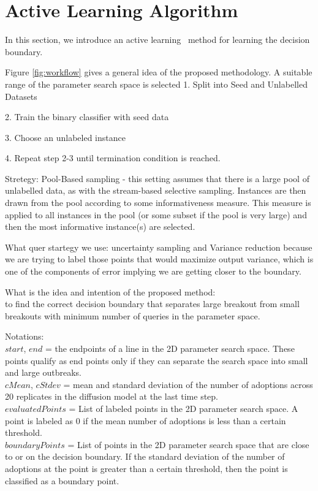 \section{Active Learning Algorithm}
In this section, we introduce an active learning~\cite{sung95active} method for learning the decision boundary. 

Figure \ref{fig:workflow} gives a general idea of the proposed methodology. A suitable range of the parameter search space is selected
1. Split into Seed and Unlabelled Datasets

2. Train the binary classifier with seed data

3. Choose an unlabeled instance

4. Repeat step 2-3 until termination condition is reached.



Stretegy:
Pool-Based sampling - this setting assumes that there is a large pool of unlabelled data, as with the stream-based selective sampling. Instances are then drawn from the pool according to some informativeness measure. This measure is applied to all instances in the pool (or some subset if the pool is very large) and then the most informative instance(s) are selected.

What quer startegy we use: uncertainty sampling and Variance reduction because we are trying to label those points that would maximize output variance, which is one of the components of error implying we are getting closer to the boundary.


What is the idea and intention of the proposed method: \\
to find the correct decision boundary that separates large breakout from small breakouts with minimum number of queries in the parameter space.



Notations:\\
$start$, $end$ = the endpoints of a line in the 2D parameter search space. These points qualify as end points only if they can separate the search space into small and large outbreaks. \\
\noindent
$cMean$, $cStdev$ = mean and standard deviation of the number of adoptions across 20 replicates in the diffusion model at the last time step.\\
\noindent
$evaluatedPoints$ = List of labeled points in the 2D parameter search space. A point is labeled as 0 if the mean number of adoptions is less than a certain threshold.\\
\noindent
$boundaryPoints$ = List of points in the 2D parameter search space that are close to or on the decision boundary. If the standard deviation of the number of adoptions at the point is greater than a certain threshold, then the point is classified as a boundary point.




